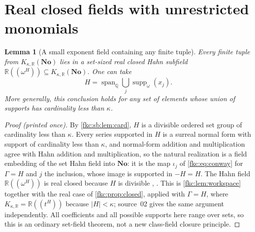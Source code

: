 \documentclass[11pt,letterpaper]{article}
\numberwithin{equation}{section}
\newtheorem{lemma}[theorem]{Lemma}
\theoremstyle{definition}
\theoremstyle{remark}
\newcommand{\R}{\mathbb R}
\newcommand{\Q}{\mathbb Q}
\newcommand{\No}{\mathbf{No}}
\newcommand{\suppw}{\operatorname{supp}_{\omega}}
\newcommand{\Span}{\operatorname{span}_{\Q}}
\newcommand{\card}[1]{\lvert #1\rvert}
\newcommand{\KN}[2]{K_{#1,#2}(\No)}%
\begin{document}
\section{Real closed fields with unrestricted monomials}\label{fkc:sb:sec:fields}

\begin{lemma}[A small exponent field containing any finite tuple]\label{fkc:sb:lem:hahn}
Every finite tuple from $\KN\kappa\R$ lies in a set-sized real closed Hahn subfield $\R((\omega^H))\subseteq\KN\kappa\R$. One can take
\[
 H=\Span\bigcup_j\suppw(x_j).
\]
More generally, this conclusion holds for any set of elements whose union of supports has cardinality less than $\kappa$.
\end{lemma}
\begin{proof}[Proof \textup{(printed once)}]
By \cref{fkc:sb:lem:card}, $H$ is a divisible ordered set group of cardinality less than $\kappa$. Every series supported in $H$ is a surreal normal form with support of cardinality less than $\kappa$, and normal-form addition and multiplication agree with Hahn addition and multiplication, so the natural realization is a field embedding of the set Hahn field into $\No$: it is the map $\iota_j$ of \eqref{fkc:eq:conway} for $\Gamma=H$ and $j$ the inclusion, whose image is supported in $-H=H$. The Hahn field $\R((\omega^H))$ is real closed because $H$ is divisible \cite[Section~2]{KS}, \cite[Section~2]{MM}. This is \cref{fkc:lem:workspace} together with the real case of \cref{fkc:prop:closed}, applied with $\Gamma=H$, where $K_{\kappa,\R}=\R((t^H))$ because $\card H<\kappa$; source~02 gives the same argument independently. All coefficients and all possible supports here range over sets, so this is an ordinary set-field theorem, not a new class-field closure principle.
\end{proof}
\end{document}
